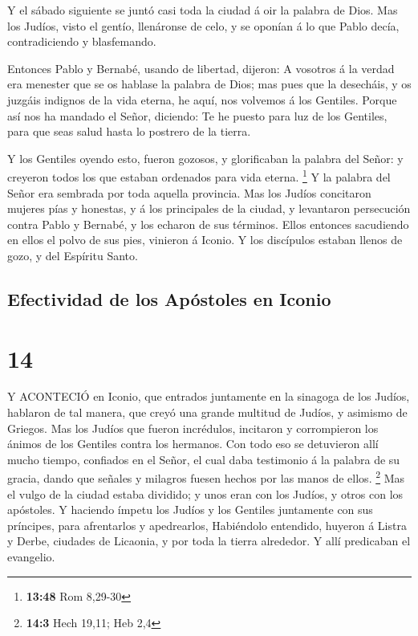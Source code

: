  Y el sábado siguiente se juntó casi toda la ciudad á oir
la palabra de Dios.  Mas los Judíos, visto el gentío,
llenáronse de celo, y se oponían á lo que Pablo decía, contradiciendo y
blasfemando.

 Entonces Pablo y Bernabé, usando de libertad, dijeron: A
vosotros á la verdad era menester que se os hablase la palabra de Dios;
mas pues que la desecháis, y os juzgáis indignos de la vida eterna, he
aquí, nos volvemos á los Gentiles.  Porque así nos ha
mandado el Señor, diciendo: Te he puesto para luz de los Gentiles, para
que seas salud hasta lo postrero de la tierra.

 Y los Gentiles oyendo esto, fueron gozosos, y glorificaban
la palabra del Señor: y creyeron todos los que estaban ordenados para
vida eterna. \footnote{\textbf{13:48} Rom 8,29-30}  Y la
palabra del Señor era sembrada por toda aquella provincia. 
Mas los Judíos concitaron mujeres pías y honestas, y á los principales
de la ciudad, y levantaron persecución contra Pablo y Bernabé, y los
echaron de sus términos.  Ellos entonces sacudiendo en
ellos el polvo de sus pies, vinieron á Iconio.  Y los
discípulos estaban llenos de gozo, y del Espíritu Santo.

\hypertarget{efectividad-de-los-apuxf3stoles-en-iconio}{%
\subsection{Efectividad de los Apóstoles en
Iconio}\label{efectividad-de-los-apuxf3stoles-en-iconio}}

\hypertarget{section-13}{%
\section{14}\label{section-13}}

 Y ACONTECIÓ en Iconio, que entrados juntamente en la
sinagoga de los Judíos, hablaron de tal manera, que creyó una grande
multitud de Judíos, y asimismo de Griegos.  Mas los Judíos
que fueron incrédulos, incitaron y corrompieron los ánimos de los
Gentiles contra los hermanos.  Con todo eso se detuvieron
allí mucho tiempo, confiados en el Señor, el cual daba testimonio á la
palabra de su gracia, dando que señales y milagros fuesen hechos por las
manos de ellos. \footnote{\textbf{14:3} Hech 19,11; Heb 2,4}
 Mas el vulgo de la ciudad estaba dividido; y unos eran con
los Judíos, y otros con los apóstoles.  Y haciendo ímpetu
los Judíos y los Gentiles juntamente con sus príncipes, para afrentarlos
y apedrearlos,  Habiéndolo entendido, huyeron á Listra y
Derbe, ciudades de Licaonia, y por toda la tierra alrededor.
 Y allí predicaban el evangelio.

